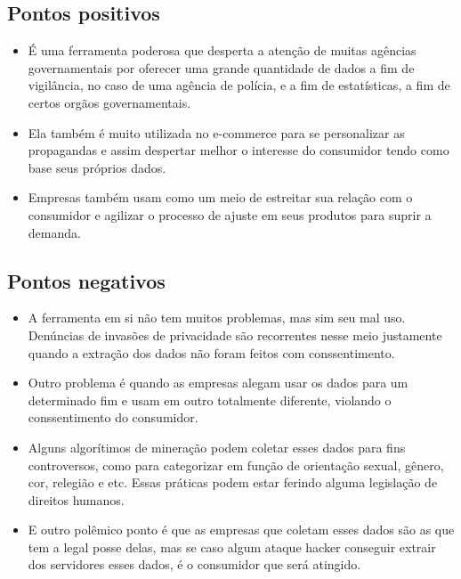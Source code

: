 \documentclass [a4paper, 10pt] {article}
\begin{document}
\subsection{Pontos positivos}
\begin{itemize}
\item É uma ferramenta poderosa que desperta a atenção de muitas agências governamentais por oferecer uma grande quantidade de dados a fim de vigilância, no caso de uma agência de polícia, e a fim de estatísticas, a fim de certos orgãos governamentais.
\item Ela também é muito utilizada no e-commerce para se personalizar as propagandas e assim despertar melhor o interesse do consumidor tendo como base seus próprios dados.
\item Empresas também usam como um meio de estreitar sua relação com o consumidor e agilizar o processo de ajuste em seus produtos para suprir a demanda.

\end{itemize}
\subsection{Pontos negativos}
\begin{itemize}

\item A ferramenta em si não tem muitos problemas, mas sim seu mal uso. Denúncias de invasões de privacidade são recorrentes nesse meio justamente quando a extração dos dados não foram feitos com conssentimento.
\item Outro problema é quando as empresas alegam usar os dados para um determinado fim e usam em outro totalmente diferente, violando o conssentimento do consumidor.
\item Alguns algorítimos de mineração podem coletar esses dados para fins controversos, como para categorizar em função de orientação sexual, gênero, cor, relegião e etc. Essas práticas podem estar ferindo alguma legislação de direitos humanos.
\item E outro polêmico ponto é que as empresas que coletam esses dados são as que tem a legal posse delas, mas se caso algum ataque hacker conseguir extrair dos servidores esses dados, é o consumidor que será atingido.
\end{itemize}
\end{document}
